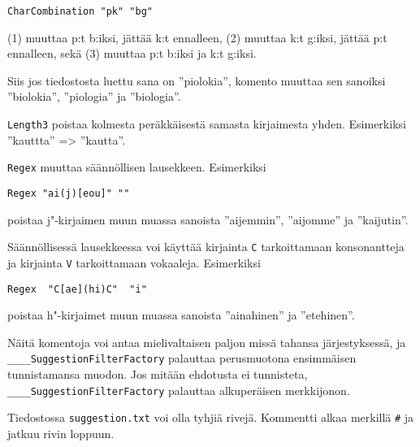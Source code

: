 \documentclass[12pt,a4paper]{scrartcl}
\begin{document}
\verb|CharCombination "pk" "bg"|

(1) muuttaa p:t b:iksi, jättää k:t ennalleen,
(2) muuttaa k:t g:iksi, jättää p:t ennalleen, sekä
(3) muuttaa p:t b:iksi ja k:t g:iksi.

Siis jos tiedostosta luettu sana on ''piolokia'', komento muuttaa sen
sanoiksi ''biolokia'', ''piologia'' ja ''biologia''.


\bigskip
\verb|Length3| poistaa kolmesta peräkkäisestä samasta kirjaimesta
yhden. Esimerkiksi ''kauttta'' => ''kautta''.


\bigskip
\verb|Regex| muuttaa säännöllisen lausekkeen. Esimerkiksi

\verb|Regex "ai(j)[eou]" ""|

poistaa j"-kirjaimen muun muassa sanoista ''aijemmin'', ''aijomme'' ja
''kaijutin''.


Säännöllisessä lausekkeessa voi käyttää kirjainta \verb|C|
tarkoittamaan konsonantteja ja kirjainta \verb|V| tarkoittamaan
vokaaleja. Esimerkiksi

\verb|Regex  "C[ae](hi)C"  "i"|

poistaa h"-kirjaimet muun muassa sanoista ''ainahinen'' ja
''etehinen''.

\bigskip
Näitä komentoja voi antaa mielivaltaisen paljon missä tahansa
järjestyksessä, ja \\ \verb|____SuggestionFilterFactory| palauttaa
perusmuotona ensimmäisen tunnistamansa muodon. Jos mitään ehdotusta ei
tunnisteta, \verb|____SuggestionFilterFactory| palauttaa alkuperäisen
merkkijonon.

Tiedostossa \verb|suggestion.txt| voi olla tyhjiä rivejä. Kommentti
alkaa merkillä \verb|#| ja jatkuu rivin loppuun.
\end{document}
